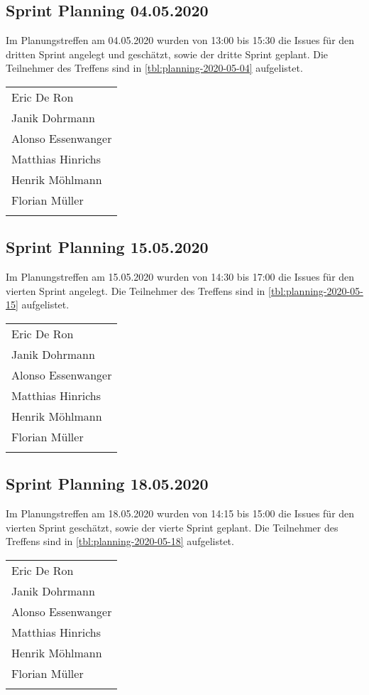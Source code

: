 	\subsection{Sprint Planning 04.05.2020}
	Im Planungstreffen am 04.05.2020 wurden von 13:00 bis 15:30 die Issues für den dritten Sprint angelegt und geschätzt, sowie der dritte Sprint geplant. Die Teilnehmer des Treffens sind in \autoref{tbl:planning-2020-05-04} aufgelistet.
		\begin{tabularx}{0.75\textwidth}{l}
			\hline
			\endhead
			Eric De Ron\\
			Janik Dohrmann\\
			Alonso Essenwanger\\
			Matthias Hinrichs\\
			Henrik Möhlmann\\
			Florian Müller\\
			\hline
			\caption{Teilnehmer 04.05.2020}
			\label{tbl:planning-2020-05-04}
		\end{tabularx}
	\subsection{Sprint Planning 15.05.2020}
	Im Planungstreffen am 15.05.2020 wurden von 14:30 bis 17:00 die Issues für den vierten Sprint angelegt. Die Teilnehmer des Treffens sind in \autoref{tbl:planning-2020-05-15} aufgelistet.
		\begin{tabularx}{0.75\textwidth}{l}
			\hline
			\endhead
			Eric De Ron\\
			Janik Dohrmann\\
			Alonso Essenwanger\\
			Matthias Hinrichs\\
			Henrik Möhlmann\\
			Florian Müller\\
			\hline
			\caption{Teilnehmer 15.05.2020}
			\label{tbl:planning-2020-05-15}
		\end{tabularx}
	\subsection{Sprint Planning 18.05.2020}
	Im Planungstreffen am 18.05.2020 wurden von 14:15 bis 15:00 die Issues für den vierten Sprint geschätzt, sowie der vierte Sprint geplant. Die Teilnehmer des Treffens sind in \autoref{tbl:planning-2020-05-18} aufgelistet.
	\newpage
		\begin{tabularx}{0.75\textwidth}{l}
			\hline
			\endhead
			Eric De Ron\\
			Janik Dohrmann\\
			Alonso Essenwanger\\
			Matthias Hinrichs\\
			Henrik Möhlmann\\
			Florian Müller\\
			\hline
			\caption{Teilnehmer 18.05.2020}
			\label{tbl:planning-2020-05-18}
		\end{tabularx}
